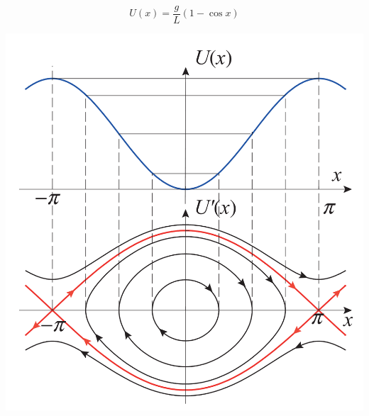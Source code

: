 

\begin{ejer}
	\[U(x) = \frac{g}{L} (1-\cos{x})\]
	\begin{center}
		\includegraphics{graphs/pendul-fase_1.png}
	\end{center}

\end{ejer}
